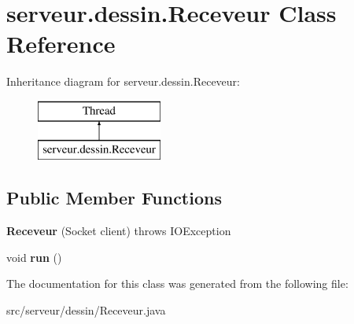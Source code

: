 \hypertarget{classserveur_1_1dessin_1_1_receveur}{}\section{serveur.\+dessin.\+Receveur Class Reference}
\label{classserveur_1_1dessin_1_1_receveur}
Inheritance diagram for serveur.\+dessin.\+Receveur\+:\begin{figure}[H]
\begin{center}
\leavevmode
\includegraphics[height=2.000000cm]{classserveur_1_1dessin_1_1_receveur}
\end{center}
\end{figure}
\subsection*{Public Member Functions}
\begin{DoxyCompactItemize}
\item 
\mbox{\label{classserveur_1_1dessin_1_1_receveur_a3892a18f449d0ef492302513c9e4b85f}} 
{\bfseries Receveur} (Socket client)  throws I\+O\+Exception 
\item 
\mbox{\label{classserveur_1_1dessin_1_1_receveur_a4dc31908416357009120361ae5bd72d1}} 
void {\bfseries run} ()
\end{DoxyCompactItemize}


The documentation for this class was generated from the following file\+:\begin{DoxyCompactItemize}
\item 
src/serveur/dessin/Receveur.\+java\end{DoxyCompactItemize}
